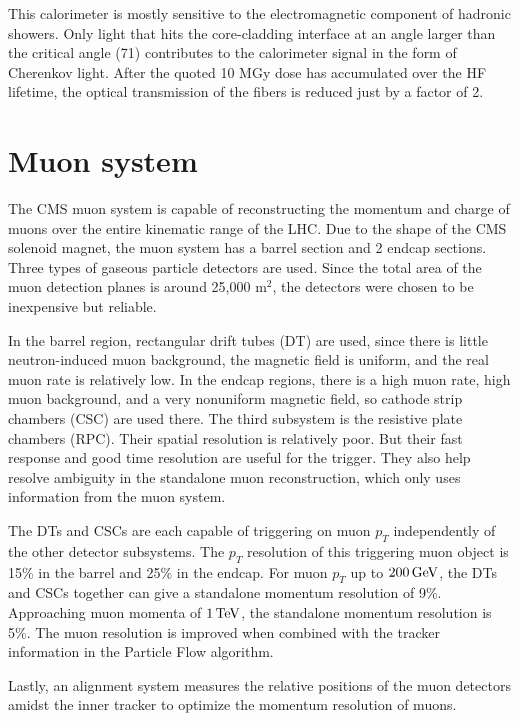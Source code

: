 This calorimeter is mostly sensitive to the electromagnetic component of hadronic showers.
Only light that hits the core-cladding interface at an angle larger than the critical angle (71\textdegree) contributes to the calorimeter signal in the form of Cherenkov light. 
After the quoted 10 MGy dose has accumulated over the HF lifetime, the optical transmission of the fibers is reduced just by a factor of 2.

\section{Muon system}
The CMS muon system is capable of reconstructing the momentum and charge of muons over the entire
kinematic range of the LHC. 
Due to the shape of the CMS solenoid magnet, the muon system has a barrel section and 2 endcap sections.
Three types of gaseous particle detectors are used.
Since the total area of the muon detection planes is around 25,000 $\textrm{m}^2$, the 
detectors were chosen to be inexpensive but reliable.

In the barrel region, rectangular drift tubes (DT) are used, 
since there is little neutron-induced muon background, the magnetic field is uniform,
and the real muon rate is relatively low.
In the endcap regions, there is a high muon rate, high muon background, and a
very nonuniform magnetic field, so cathode strip chambers (CSC) are used there.
The third subsystem is the resistive plate chambers (RPC). Their spatial resolution is relatively poor.
But their fast response and good time resolution are useful for the trigger.
They also help resolve ambiguity in the standalone muon reconstruction,
which only uses information from the muon system.

The DTs and CSCs are each capable of triggering on muon $p_T$ independently of the other detector subsystems.
The $p_T$ resolution of this triggering muon object is 15\% in the barrel and 25\% in the endcap.
For muon $p_T$ up to $200 \,\text{Ge\hspace{-.08em}V}$, the DTs and CSCs together can give a standalone momentum resolution of 9\%.
Approaching muon momenta of $1 \,\text{Te\hspace{-.08em}V}$, the standalone momentum resolution is 5\%.
The muon resolution is improved when combined with the tracker information in the Particle Flow algorithm.

Lastly, an alignment system measures the relative positions of the muon detectors amidst the inner tracker to optimize the momentum resolution of muons.

